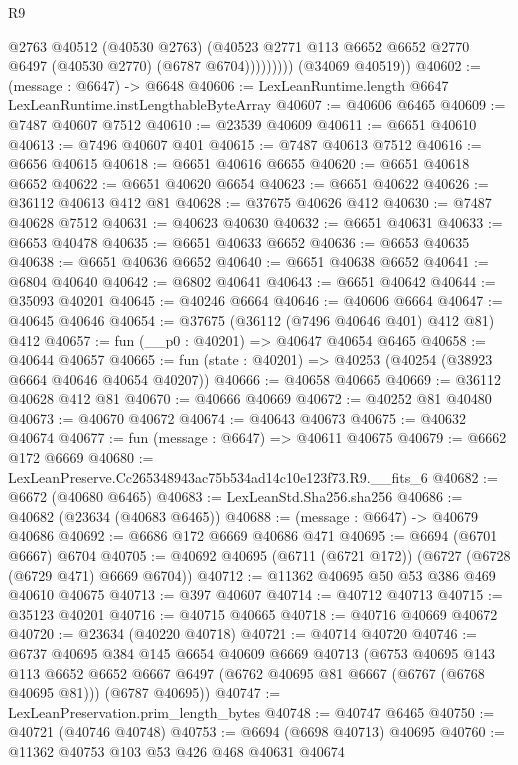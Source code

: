 \begin{lexlean}{R9}
\begin{coremodule}
                    @2763
                    @40512
                    (@40530 @2763)
                    (@40523 @2771 @113 @6652 @6652 @2770 @6497 (@40530 @2770) (@6787 @6704)))))))))
      (@34069 @40519))
@40602 := (message : @6647) -> @6648
@40606 := LexLeanRuntime.length @6647 LexLeanRuntime.instLengthableByteArray
@40607 := @40606 @6465
@40609 := @7487 @40607 @7512
@40610 := @23539 @40609
@40611 := @6651 @40610
@40613 := @7496 @40607 @401
@40615 := @7487 @40613 @7512
@40616 := @6656 @40615
@40618 := @6651 @40616 @6655
@40620 := @6651 @40618 @6652
@40622 := @6651 @40620 @6654
@40623 := @6651 @40622
@40626 := @36112 @40613 @412 @81
@40628 := @37675 @40626 @412
@40630 := @7487 @40628 @7512
@40631 := @40623 @40630
@40632 := @6651 @40631
@40633 := @6653 @40478
@40635 := @6651 @40633 @6652
@40636 := @6653 @40635
@40638 := @6651 @40636 @6652
@40640 := @6651 @40638 @6652
@40641 := @6804 @40640
@40642 := @6802 @40641
@40643 := @6651 @40642
@40644 := @35093 @40201
@40645 := @40246 @6664
@40646 := @40606 @6664
@40647 := @40645 @40646
@40654 := @37675 (@36112 (@7496 @40646 @401) @412 @81) @412
@40657 := fun (__p0 : @40201) => @40647 @40654 @6465
@40658 := @40644 @40657
@40665 := fun (state : @40201) => @40253 (@40254 (@38923 @6664 @40646 @40654 @40207))
@40666 := @40658 @40665
@40669 := @36112 @40628 @412 @81
@40670 := @40666 @40669
@40672 := @40252 @81 @40480
@40673 := @40670 @40672
@40674 := @40643 @40673
@40675 := @40632 @40674
@40677 := fun (message : @6647) => @40611 @40675
@40679 := @6662 @172 @6669
@40680 := LexLeanPreserve.Cc265348943ac75b534ad14c10e123f73.R9.__fits_6
@40682 := @6672 (@40680 @6465)
@40683 := LexLeanStd.Sha256.sha256
@40686 := @40682 (@23634 (@40683 @6465))
@40688 := (message : @6647) -> @40679 @40686
@40692 := @6686 @172 @6669 @40686 @471
@40695 := @6694 (@6701 @6667) @6704
@40705 := @40692 @40695 (@6711 (@6721 @172)) (@6727 (@6728 (@6729 @471) @6669 @6704))
@40712 := @11362 @40695 @50 @53 @386 @469 @40610 @40675
@40713 := @397 @40607
@40714 := @40712 @40713
@40715 := @35123 @40201
@40716 := @40715 @40665
@40718 := @40716 @40669 @40672
@40720 := @23634 (@40220 @40718)
@40721 := @40714 @40720
@40746 := @6737
    @40695
    @384
    @145
    @6654
    @40609
    @6669
    @40713
    (@6753
      @40695
      @143
      @113
      @6652
      @6652
      @6667
      @6497
      (@6762 @40695 @81 @6667 (@6767 (@6768 @40695 @81)))
      (@6787 @40695))
@40747 := LexLeanPreservation.prim_length_bytes
@40748 := @40747 @6465
@40750 := @40721 (@40746 @40748)
@40753 := @6694 (@6698 @40713) @40695
@40760 := @11362 @40753 @103 @53 @426 @468 @40631 @40674

\end{coremodule}
\end{lexlean}
